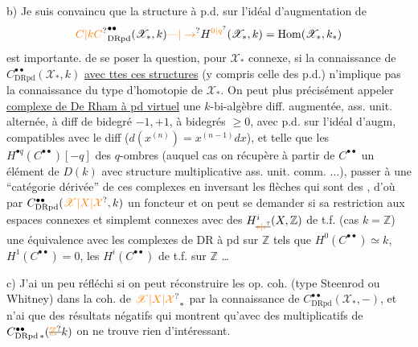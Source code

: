 b) Je suis convaincu que la structure à p.d. sur l'idéal d'augmentation de
\[
\unsure{C|kC}^{\bullet\bullet}_{\mathrm{DRpd}}(\mathscr X_{\ast},k)\unsure{\text{---}|\to}H^{\unsure{0|q}}(\mathscr X_\ast,k)=\mathrm{Hom}(\mathscr X_{\ast},k_\ast)
\]
est importante.   de se poser la question, pour $\mathscr X_\ast$  connexe, si la connaissance de $C^{\bullet\bullet}_{\mathrm{DRpd}}(\mathscr X_\ast,k)$ \uline{avec ttes ces structures} (y compris celle des p.d.) n'implique pas la connaissance du type d'homotopie de $\mathscr X_\ast$. On peut
plus précisément appeler \uline{complexe de De Rham à pd virtuel}  une  $k$-bi-algèbre diff. augmentée, ass. unit. alternée, à diff de bidegré $-1,+1$,  à bidegrés $\geq 0$, avec p.d. sur l'idéal d'augm, compatibles avec le diff ($d(x^{(n)})=x^{(n-1)}dx$), et telle que les $H^{\bullet q}(C^{\bullet\bullet})[-q]$  des $q$-ombres \unsure{$\simeq$|$\sim$} (auquel cas on récupère à partir de $C^{\bullet\bullet}$ un élément de $D(k)$ avec structure multiplicative ass. unit. comm. $\ldots$), passer à une ``catégorie dérivée'' de ces complexes en inversant les flèches qui sont des , d'où par $C^{\bullet\bullet}_{\mathrm{DRpd}}(\unsure{\mathscr X|X|\mathcal X},k)$ un foncteur
et on peut se demander si sa restriction aux espaces connexes et simplemt connexes avec des $H_{\deleted{\unsure{\ast|i}}}^{i}(X,\mathbb Z)$ de t.f. (cas $k=\mathbb Z$)   une équivalence avec les complexes de DR à pd sur $\mathbb Z$ tels que $H^0(C^{\bullet\bullet})\simeq k$, $H^1(C^{\bullet\bullet})=0$, les $H^i(C^{\bullet\bullet})$ de t.f. sur $\mathbb Z$ \ldots

c) J'ai un peu réfléchi  si on peut réconstruire les op. coh.  (type Steenrod ou Whitney) dans la coh. de $\unsure{\mathscr X|X|\mathcal X}_\ast$ par la connaissance de $C^{\bullet\bullet}_{\mathrm{DRpd}}(\mathscr X_\ast,-)$, et n'ai que des résultats  négatifs qui montrent qu'avec des  multiplicatifs de $C^{\bullet\bullet}_{\mathrm{DRpd}\,\ast}(\deleted{\unsure{\mathbb Z}}k)$ on ne trouve rien d'intéressant.

